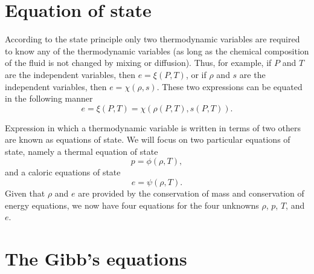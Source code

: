\documentclass[oneside,a4paper,11pt]{report}
\begin{document}
\section{Equation of state}
\label{sec:eos}
According to the state principle only two thermodynamic variables are required to know any of the thermodynamic variables (as long as the chemical composition of the fluid is not changed by mixing or diffusion). Thus, for example, if $P$ and $T$ are the independent variables, then $e = \xi(P,T)$, or if $\rho$ and $s$ are the independent variables, then $e = \chi(\rho,s)$. These two expressions can be equated in the following manner
\begin{equation}
\label{eq:state_principle}
    e = \xi(P,T) = \chi(\rho(P,T), s(P,T)).
\end{equation}

Expression in which a thermodynamic variable is written in terms of two others are known as equations of state. We will focus on two particular equations of state, namely a thermal equation of state
\begin{equation}
\label{eq:thermal_eos}
    p = \phi(\rho,T),
\end{equation}
and a caloric equations of state 
\begin{equation}
\label{eq:caloric_eos}
    e =\psi(\rho,T).
\end{equation}
Given that $\rho$ and $e$ are provided by the conservation of mass and conservation of energy equations, we now have four equations for the four unknowns $\rho$, $p$, $T$, and $e$.

\section{The Gibb's equations}
\end{document}
